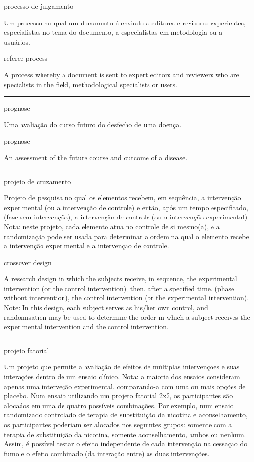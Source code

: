 \documentclass[
  openany]{book}
\begin{document}
processo de julgamento

Um processo no qual um documento é enviado a editores e revisores experientes, especialistas no tema do documento, a especialistas em metodologia ou a usuários.

referee process

A process whereby a document is sent to expert editors and reviewers who are specialists in the field, methodological specialists or users.

\begin{center}\rule{0.5\linewidth}{0.5pt}\end{center}

prognose

Uma avaliação do curso futuro do desfecho de uma doença.

prognose

An assessment of the future course and outcome of a disease.

\begin{center}\rule{0.5\linewidth}{0.5pt}\end{center}

projeto de cruzamento

Projeto de pesquisa no qual os elementos recebem, em sequência, a intervenção experimental (ou a intervenção de controle) e então, após um tempo especificado, (fase sem intervenção), a intervenção de controle (ou a intervenção experimental). Nota: neste projeto, cada elemento atua no controle de si mesmo(a), e a randomização pode ser usada para determinar a ordem na qual o elemento recebe a intervenção experimental e a intervenção de controle.

crossover design

A research design in which the subjects receive, in sequence, the experimental intervention (or the control intervention), then, after a specified time, (phase without intervention), the control intervention (or the experimental intervention). Note: In this design, each subject serves as his/her own control, and randomisation may be used to determine the order in which a subject receives the experimental intervention and the control intervention.

\begin{center}\rule{0.5\linewidth}{0.5pt}\end{center}

projeto fatorial

Um projeto que permite a avaliação de efeitos de múltiplas intervenções e suas interações dentro de um ensaio clínico. Nota: a maioria dos ensaios consideram apenas uma interveção experimental, comparando-a com uma ou mais opções de placebo. Num ensaio utilizando um projeto fatorial 2x2, os participantes são alocados em uma de quatro possíveis combinações. Por exemplo, num ensaio randomizado controlado de terapia de substituição da nicotina e aconselhamento, os participantes poderiam ser alocados nos seguintes grupos: somente com a terapia de substituição da nicotina, somente aconselhamento, ambos ou nenhum. Assim, é possível testar o efeito independente de cada intervenção na cessação do fumo e o efeito combinado (da interação entre) as duas intervenções.
\end{document}
